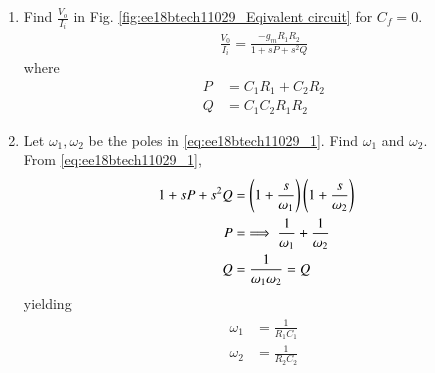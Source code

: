 \begin{enumerate}[label=\thesection.\arabic*.,ref=\thesection.\theenumi]
\item Find $\frac{V_o}{I_i}$ in Fig. 	\ref{fig:ee18btech11029_Eqivalent circuit} for $C_f = 0$.
\\
\solution 
%
\begin{align}
    \frac{V_{0}}{I_{i}} = \frac{-g_{m}R_{1}R_{2}}{1+sP+s^{2}Q}
    \label{eq:ee18btech11029_1}
\end{align}
where
\begin{align}
    \label{eq:ee18btech11029_P0}
    P&=C_{1}R_{1}+C_{2}R_{2}\\
    Q&=C_{1}C_{2}R_{1}R_{2}
    \label{eq:ee18btech11029_Q0}
\end{align}
%
\item Let $\omega_1, \omega_2$ be the poles in \eqref{eq:ee18btech11029_1}.  Find $ \omega_1$ and $ \omega_2$.
%
\\
\solution From \eqref{eq:ee18btech11029_1},
\begin{align}
1+sP+s^{2}Q &= \brak{1+\frac{s}{\omega_{1}}}\brak{1+\frac{s}{\omega_{2}}}&
\\
P &= \implies \frac{1}{\omega_{1}} + \frac{1}{\omega_{2}}
\\
Q &= \frac{1}{\omega_1\omega_2} = Q 
    \label{eq:ee18btech11029_PQ_pole}
\end{align}
yielding 
\begin{align}
\label{eq:ee18btech11029_f}
\begin{split}
    \omega_{1} &= \frac{1}{ R_{1}C_{1}}\\
    \omega_{2}  &= \frac{1}{ R_{2}C_{2}}
\end{split}
\end{align}


\end{enumerate}
